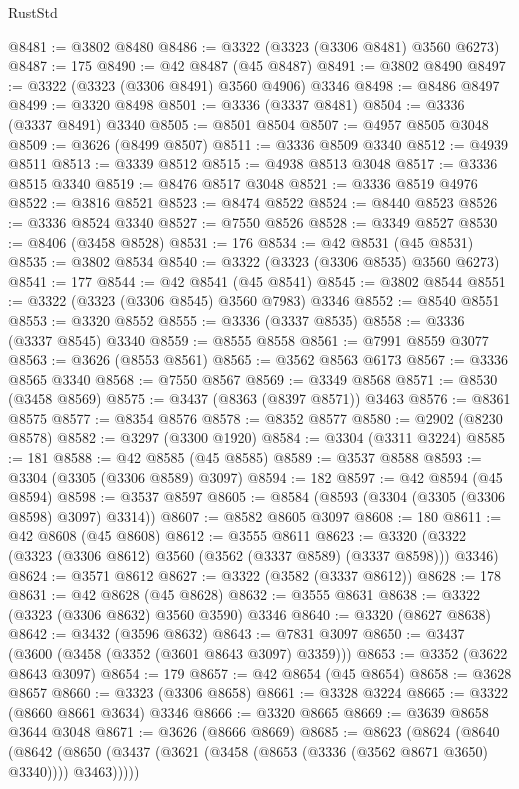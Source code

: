 \begin{lexlean}{RustStd}
\begin{coremodule}
@8481 := @3802 @8480
@8486 := @3322 (@3323 (@3306 @8481) @3560 @6273)
@8487 := 175
@8490 := @42 @8487 (@45 @8487)
@8491 := @3802 @8490
@8497 := @3322 (@3323 (@3306 @8491) @3560 @4906) @3346
@8498 := @8486 @8497
@8499 := @3320 @8498
@8501 := @3336 (@3337 @8481)
@8504 := @3336 (@3337 @8491) @3340
@8505 := @8501 @8504
@8507 := @4957 @8505 @3048
@8509 := @3626 (@8499 @8507)
@8511 := @3336 @8509 @3340
@8512 := @4939 @8511
@8513 := @3339 @8512
@8515 := @4938 @8513 @3048
@8517 := @3336 @8515 @3340
@8519 := @8476 @8517 @3048
@8521 := @3336 @8519 @4976
@8522 := @3816 @8521
@8523 := @8474 @8522
@8524 := @8440 @8523
@8526 := @3336 @8524 @3340
@8527 := @7550 @8526
@8528 := @3349 @8527
@8530 := @8406 (@3458 @8528)
@8531 := 176
@8534 := @42 @8531 (@45 @8531)
@8535 := @3802 @8534
@8540 := @3322 (@3323 (@3306 @8535) @3560 @6273)
@8541 := 177
@8544 := @42 @8541 (@45 @8541)
@8545 := @3802 @8544
@8551 := @3322 (@3323 (@3306 @8545) @3560 @7983) @3346
@8552 := @8540 @8551
@8553 := @3320 @8552
@8555 := @3336 (@3337 @8535)
@8558 := @3336 (@3337 @8545) @3340
@8559 := @8555 @8558
@8561 := @7991 @8559 @3077
@8563 := @3626 (@8553 @8561)
@8565 := @3562 @8563 @6173
@8567 := @3336 @8565 @3340
@8568 := @7550 @8567
@8569 := @3349 @8568
@8571 := @8530 (@3458 @8569)
@8575 := @3437 (@8363 (@8397 @8571)) @3463
@8576 := @8361 @8575
@8577 := @8354 @8576
@8578 := @8352 @8577
@8580 := @2902 (@8230 @8578)
@8582 := @3297 (@3300 @1920)
@8584 := @3304 (@3311 @3224)
@8585 := 181
@8588 := @42 @8585 (@45 @8585)
@8589 := @3537 @8588
@8593 := @3304 (@3305 (@3306 @8589) @3097)
@8594 := 182
@8597 := @42 @8594 (@45 @8594)
@8598 := @3537 @8597
@8605 := @8584 (@8593 (@3304 (@3305 (@3306 @8598) @3097) @3314))
@8607 := @8582 @8605 @3097
@8608 := 180
@8611 := @42 @8608 (@45 @8608)
@8612 := @3555 @8611
@8623 := @3320 (@3322 (@3323 (@3306 @8612) @3560 (@3562 (@3337 @8589) (@3337 @8598))) @3346)
@8624 := @3571 @8612
@8627 := @3322 (@3582 (@3337 @8612))
@8628 := 178
@8631 := @42 @8628 (@45 @8628)
@8632 := @3555 @8631
@8638 := @3322 (@3323 (@3306 @8632) @3560 @3590) @3346
@8640 := @3320 (@8627 @8638)
@8642 := @3432 (@3596 @8632)
@8643 := @7831 @3097
@8650 := @3437 (@3600 (@3458 (@3352 (@3601 @8643 @3097) @3359)))
@8653 := @3352 (@3622 @8643 @3097)
@8654 := 179
@8657 := @42 @8654 (@45 @8654)
@8658 := @3628 @8657
@8660 := @3323 (@3306 @8658)
@8661 := @3328 @3224
@8665 := @3322 (@8660 @8661 @3634) @3346
@8666 := @3320 @8665
@8669 := @3639 @8658 @3644 @3048
@8671 := @3626 (@8666 @8669)
@8685 := @8623
    (@8624
      (@8640
        (@8642 (@8650 (@3437 (@3621 (@3458 (@8653 (@3336 (@3562 @8671 @3650) @3340)))) @3463)))))

\end{coremodule}
\end{lexlean}
